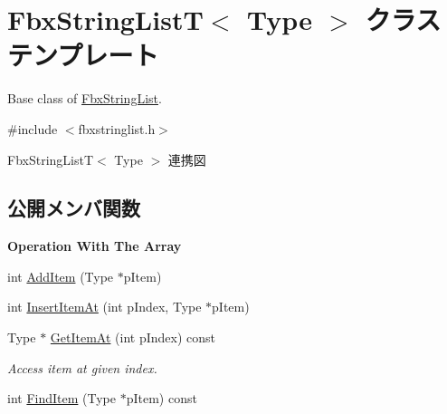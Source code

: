 \hypertarget{class_fbx_string_list_t}{}\section{Fbx\+String\+ListT$<$ Type $>$ クラステンプレート}
\label{class_fbx_string_list_t}


Base class of \hyperlink{class_fbx_string_list}{Fbx\+String\+List}.  




{\ttfamily \#include $<$fbxstringlist.\+h$>$}



Fbx\+String\+ListT$<$ Type $>$ 連携図
\subsection*{公開メンバ関数}
\begin{Indent}\textbf{ Operation With The Array}\par
\begin{DoxyCompactItemize}
\item 
int \hyperlink{class_fbx_string_list_t_aa8dfd9f7ca27dafca1f2c80aa8590a19}{Add\+Item} (Type $\ast$p\+Item)
\item 
int \hyperlink{class_fbx_string_list_t_aa9bd662d4638b711c615e37a9038a038}{Insert\+Item\+At} (int p\+Index, Type $\ast$p\+Item)
\item 
Type $\ast$ \hyperlink{class_fbx_string_list_t_a86ee3c651fea2cb1fe50896bc93ef685}{Get\+Item\+At} (int p\+Index) const
\begin{DoxyCompactList}\small\item\em Access item at given index. \end{DoxyCompactList}\item 
int \hyperlink{class_fbx_string_list_t_a9d903a2352e10982c18d3e37fcc58ef6}{Find\+Item} (Type $\ast$p\+Item) const
\end{DoxyCompactItemize}
\end{Indent}
